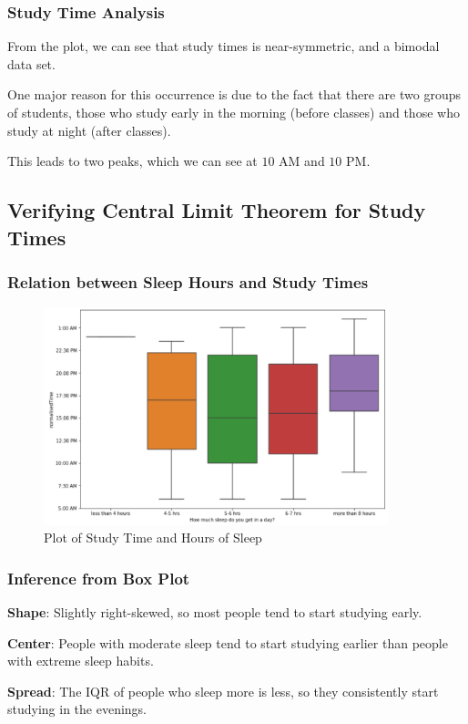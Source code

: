 \documentclass[11pt,]{beamer}
\begin{document}
\begin{frame}

    \frametitle{Study Time Analysis}
    
    From the plot, we can see that study times is near-symmetric, and a bimodal data set. 
    
    \bigskip
    
    One major reason for this occurrence is due to the fact that there are two groups of students, those who study early in the morning (before classes) and those who study at night (after classes). 
    
    \bigskip
    
    This leads to two peaks, which we can see at $10$ AM and $10$ PM. 
    
\end{frame}

\subsection{Verifying Central Limit Theorem for Study Times}

\begin{frame}

    \frametitle{Relation between Sleep Hours and Study Times}
    
    \begin{figure}
        \includegraphics[width=10cm]{Box_Plt_Sleep_Hrs.png}
        \caption{Plot of Study Time and Hours of Sleep}
    \end{figure}
    
\end{frame}

\begin{frame}

    \frametitle{Inference from Box Plot}
    
    \textbf{Shape}: Slightly right-skewed, so most people tend to start studying early.
    
    \bigskip
    
    \textbf{Center}: People with moderate sleep tend to start studying earlier than people with extreme sleep habits.
    
    \bigskip
    
    \textbf{Spread}: The IQR of people who sleep more is less, so they consistently start studying in the evenings. 
    
\end{frame}
\end{document}
